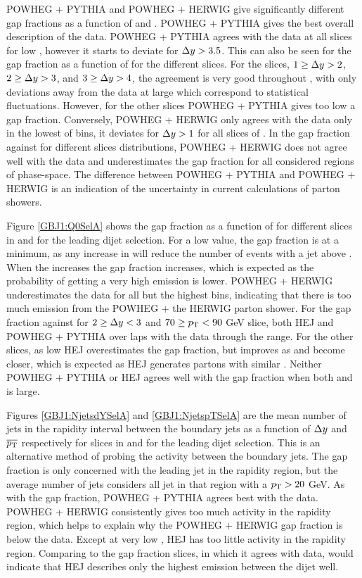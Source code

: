 POWHEG + PYTHIA and POWHEG + HERWIG give significantly different gap fractions as a function of \dy{} and \ptb{}.
POWHEG + PYTHIA gives the best overall description of the data.
POWHEG + PYTHIA agrees with the data at all \ptb{} slices for low \dy{}, however it starts to deviate for $\mbox{$\Delta y$}{}>3.5$. 
This can also be seen for the gap fraction as a function of \ptb{} for the different \dy{} slices. 
For the slices, $1\ge\mbox{$\Delta y$}{}>2$, $2\ge\mbox{$\Delta y$}{}>3$, and $3\ge\mbox{$\Delta y$}{}>4$, the agreement is very good throughout \ptb{}, with only deviations away from the data at large \dy{} which correspond to statistical fluctuations.
However, for the other \dy{} slices POWHEG + PYTHIA gives too low a gap fraction.
Conversely, POWHEG + HERWIG only agrees with the data only in the lowest of \dy{} bins, it deviates for $\mbox{$\Delta y$}{}>1$ for all slices of \ptb{}. 
In the gap fraction against \ptb{} for different \dy{} slices distributions, POWHEG + HERWIG does not agree well with the data and underestimates the gap fraction for all considered regions of phase-space.
The difference between POWHEG + PYTHIA and POWHEG + HERWIG is an indication of the uncertainty in current calculations of parton showers.


Figure \ref{GBJ1:Q0SelA} shows the gap fraction as a function of \qz{} for different slices in \dy{} and \ptb{} for the leading \pt{} dijet selection.
For a low \qz{} value, the gap fraction is at a minimum, as any increase in \qz{} will reduce the number of events with a jet above \qz{}.
When the \qz{} increases the gap fraction increases, which is expected as the probability of getting a very high \pt{} emission is lower.
POWHEG + HERWIG underestimates the data for all but the highest \qz{} bins, indicating that there is too much emission from the POWHEG + the HERWIG parton shower. 
For the gap fraction against \qz{} for $2\ge\mbox{$\Delta y$}{}<3$ and  $70\ge\mbox{$p_{\rm T}$}{}<90$ GeV slice, both HEJ and POWHEG + PYTHIA over laps with the data through the \qz{} range. 
For the other slices, as low \qz{} HEJ overestimates the gap fraction, but improves as \qz{} and \ptb{} become closer, which is expected as HEJ generates partons with similar \pt{}.
Neither POWHEG + PYTHIA or HEJ agrees well with the gap fraction when both \dy{} and \qz{} is large.



Figures \ref{GBJ1:NjetsdYSelA} and \ref{GBJ1:NjetspTSelA} are the mean number of jets in the rapidity interval between the boundary jets as a function of $\mbox{$\Delta y$}{}$ and $\mbox{$\overline{p_{\rm T}}$}{}$ respectively for slices in \ptb{} and \dy{} for the leading \pt{} dijet selection. 
This is an alternative method of probing the activity between the boundary jets. 
The gap fraction is only concerned with the leading jet in the rapidity region, but the average number of jets considers all jet in that region with a $\mbox{$p_{\rm T}$}{}>20$ GeV. 
As with the gap fraction, POWHEG + PYTHIA agrees best with the data.
POWHEG + HERWIG consistently gives too much activity in the rapidity region, which helps to explain why the POWHEG + HERWIG gap fraction is below the data.
Except at very low \ptb{}, HEJ has too little activity in the rapidity region.
Comparing to the gap fraction slices, in which it agrees with data, would indicate that HEJ describes only the highest \pt{} emission between the dijet well. 

